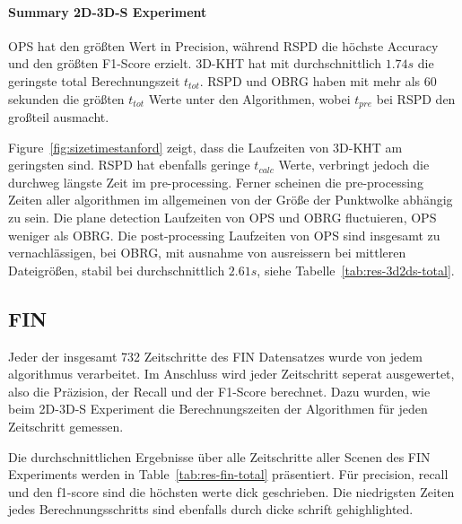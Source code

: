 \documentclass[main.tex]{subfiles}
\begin{document}
\paragraph{Summary 2D-3D-S Experiment}
OPS hat den größten Wert in Precision, während RSPD die höchste Accuracy und den größten F1-Score erzielt.
3D-KHT hat mit durchschnittlich $1.74s$ die geringste total Berechnungszeit $t_{tot}$. RSPD und OBRG haben mit mehr als 60 sekunden
die größten $t_{tot}$ Werte unter den Algorithmen, wobei $t_{pre}$ bei RSPD den großteil ausmacht.

Figure~\ref{fig:sizetimestanford} zeigt, dass die Laufzeiten von 3D-KHT am geringsten sind. RSPD hat ebenfalls geringe $t_{calc}$ Werte,
verbringt jedoch die durchweg längste Zeit im pre-processing.
Ferner scheinen die pre-processing Zeiten aller algorithmen im allgemeinen von der Größe der Punktwolke abhängig zu sein.
Die plane detection Laufzeiten von OPS und OBRG fluctuieren, OPS weniger als OBRG.
Die post-processing Laufzeiten von OPS sind insgesamt zu vernachlässigen, bei OBRG, mit ausnahme von ausreissern bei mittleren Dateigrößen,
stabil bei durchschnittlich $2.61s$, siehe Tabelle~\ref{tab:res-3d2ds-total}.

\subsection{FIN}
Jeder der insgesamt 732 Zeitschritte des FIN Datensatzes wurde von jedem algorithmus verarbeitet. Im Anschluss wird
jeder Zeitschritt seperat ausgewertet, also die Präzision, der Recall und der F1-Score berechnet. Dazu
wurden, wie beim 2D-3D-S Experiment die Berechnungszeiten der Algorithmen für jeden Zeitschritt gemessen.

Die durchschnittlichen Ergebnisse über alle Zeitschritte aller Scenen des FIN Experiments werden
in Table~\ref{tab:res-fin-total} präsentiert. Für precision, recall und den f1-score sind die höchsten werte dick geschrieben.
Die niedrigsten Zeiten jedes Berechnungsschritts sind ebenfalls durch dicke schrift gehighlighted.
\end{document}
